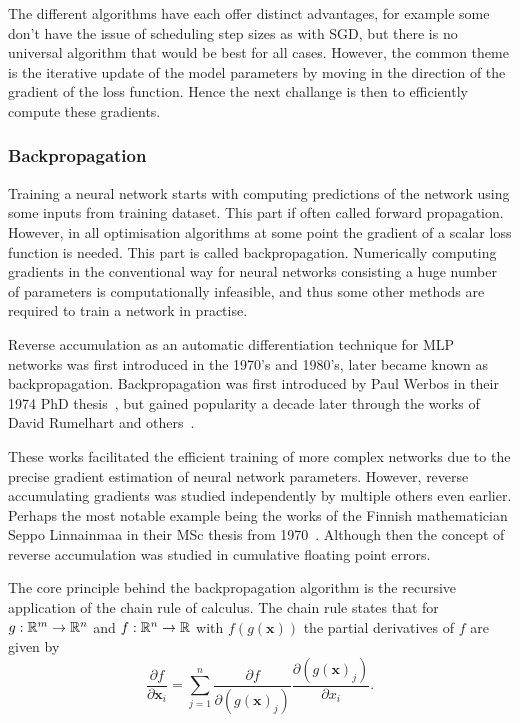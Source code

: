 The different algorithms have each offer distinct advantages, for example some don't have the issue of scheduling step sizes as with SGD, but there is no universal algorithm that would be best for all cases.
However, the common theme is the iterative update of the model parameters by moving in the direction of the gradient of the loss function.
Hence the next challange is then to efficiently compute these gradients.

\subsubsection{Backpropagation}
Training a neural network starts with computing predictions of the network using some inputs from training dataset.
This part if often called forward propagation.
However, in all optimisation algorithms at some point the gradient of a scalar loss function is needed.
This part is called backpropagation.
Numerically computing gradients in the conventional way for neural networks consisting a huge number of parameters is computationally infeasible, and thus some other methods are required to train a network in practise.

Reverse accumulation as an automatic differentiation technique for MLP networks was first introduced in the 1970's and 1980's, later became known as backpropagation.
Backpropagation was first introduced by Paul Werbos in their 1974 PhD thesis~\cite{werbos}, but gained popularity a decade later through the works of David Rumelhart and others~\cite{rumelhartetal}.

These works facilitated the efficient training of more complex networks due to the precise gradient estimation of neural network parameters.
However, reverse accumulating gradients was studied independently by multiple others even earlier.
Perhaps the most notable example being the works of the Finnish mathematician Seppo Linnainmaa in their MSc thesis from 1970~\cite{linnainmaa}.
Although then the concept of reverse accumulation was studied in cumulative floating point errors.

The core principle behind the backpropagation algorithm is the recursive application of the chain rule of calculus.
The chain rule states that for $g: \mathbb{R}^{m}\rightarrow \mathbb{R}^{n}$ and $f: \mathbb{R}^{n} \rightarrow \mathbb{R}$ with $f(g(\bm{x}))$ the partial derivatives of $f$ are given by
\begin{equation}
    \frac{\partial f}{\partial \bm{x}_{i}} = \sum_{j = 1}^{n} \frac{\partial f}{\partial (g(\bm{x})_{j})} \frac{\partial (g(\bm{x})_{j})}{\partial x_{i}}.
\end{equation}

